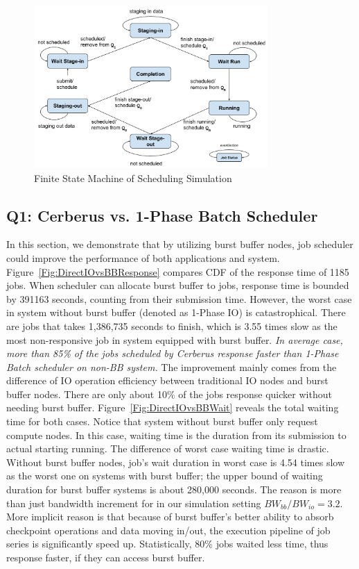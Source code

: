 \begin{figure}[!t]
        \centering
        \includegraphics[width=3.5in]{3PhaseJobFSM}
        \caption{Finite State Machine of Scheduling Simulation}
        \label{Fig:JobFSM}
\end{figure}


\subsection{Q1: Cerberus vs. 1-Phase Batch Scheduler}
\label{Sec:Sim:DirectIOvsBB}
In this section, we demonstrate that by utilizing burst buffer nodes,
job scheduler could improve the performance of both applications and system.
Figure~\ref{Fig:DirectIOvsBBResponse} compares CDF of the response time of 1185 jobs.
When scheduler can allocate burst buffer to jobs,
response time is bounded by 391163 seconds, counting from their submission time.
However, the worst case in system without burst buffer
(denoted as 1-Phase IO) is catastrophical.
There are jobs that takes 1,386,735 seconds to finish,
which is 3.55 times slow as the most non-responsive job
in system equipped with burst buffer.
\textit{In average case, more than 85\% of the jobs scheduled by Cerberus
response faster than 1-Phase Batch scheduler on non-BB system.}
The improvement mainly comes from the difference of IO operation efficiency between
traditional IO nodes and burst buffer nodes.
There are only about 10\% of the jobs response quicker without needing burst buffer.
Figure~\ref{Fig:DirectIOvsBBWait} reveals the total waiting time for both cases.
Notice that system without burst buffer only request compute nodes.
In this case, waiting time is the duration from its submission
to actual starting running.
The difference of worst case waiting time is drastic.
Without burst buffer nodes, job's wait duration in worst case is 4.54 times
slow as the worst one on systems with burst buffer;
the upper bound of waiting duration for burst buffer systems is about 280,000 seconds.
The reason is more than just bandwidth increment
for in our simulation setting $BW_{bb} / BW_{io}=3.2$.
More implicit reason is that because of burst buffer's better ability to
absorb checkpoint operations and data moving in/out,
the execution pipeline of job series is significantly speed up.
Statistically, 80\% jobs waited less time, thus response faster,
if they can access burst buffer.


